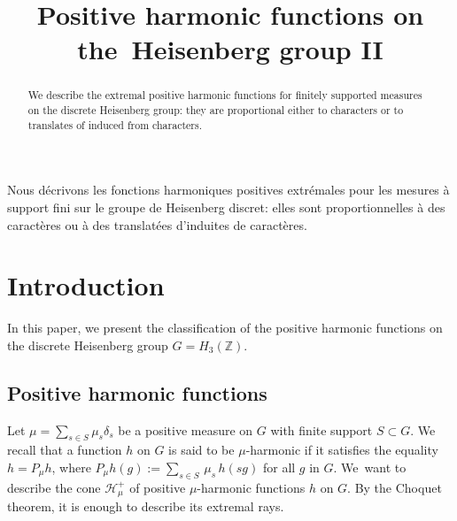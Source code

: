 \documentclass[JEP,XML,SOM,Unicode]{cedram}
\let\mathcal\mathscr
\theoremstyle{definition}
\newcommand{\m}[1]{\mathbb{ #1}}
\newcommand{\mc}[1]{\mathcal{ #1}}
\let\de\delta
\begin{document}
\frontmatter
\title{Positive harmonic functions on the~Heisenberg group II}

\author[\initial{Y.} \lastname{Benoist}]{ }
\address{IMO, CNRS, Université Paris-Saclay\\
Bâtiment 307, 91405 Orsay, France}

\begin{abstract}
We describe the extremal positive harmonic functions for finitely supported measures on the discrete Heisenberg group: they are proportional either to characters or to translates of induced from characters.
\end{abstract}




\begin{altabstract}
Nous décrivons les fonctions harmoniques positives extrémales pour les mesures à support fini sur le groupe de Heisenberg discret: elles sont proportionnelles à des caractères ou à des translatées d'induites de caractères.
\end{altabstract}

\maketitle
\tableofcontents
\mainmatter

\section{Introduction}

In this paper, we present the classification
of the positive harmonic functions
on the discrete Heisenberg group $G=H_3(\m Z)$.

\subsection{Positive harmonic functions}

Let $\mu=\sum_{s\in S} \mu_s \de_s$ be a positive measure on $G$
with finite support $S\subset G$.
We recall that a function $h$ on $G$ is said to be $\mu$-harmonic
if it satisfies the equality
$h= P_\mu h$, where $P_\mu h(g):= \sum_{s\in S} \,\mu_s\, h(sg)$ for all $g$ in $G$.
We~want to describe the cone $\mc H_\mu^+$ of positive $\mu$-harmonic functions $h$ on $G$.
By the Choquet theorem, it is enough to describe its extremal rays.
\end{document}
